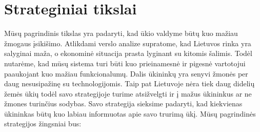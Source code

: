 \documentclass[oneside]{VUMIFPSkursinis}
\begin{document}
\section{Strateginiai tikslai}
	Mūsų pagrindinis tikslas yra padaryti, kad ūkio valdyme būtų kuo mažiau žmogaus įsikišimo. Atlikdami verslo analize supratome, kad Lietuvos rinka yra salyginai maža, o ekonominė situacija prasta lyginant su kitomis šalimis. Todėl nutarėme, kad mūsų sistema turi būti kuo prieinamesnė ir pigesnė vartotojui paaukojant kuo mažiau funkcionalumų. Dalis ūkininkų yra senyvi žmonės per daug nesusipažinę su technologijomis. Taip pat Lietuvoje nėra tiek daug didelių žemės ūkių todėl savo strategijoje turime atsižvelgti ir į mažus ūkininkus ar ne žmones turinčius sodybas. Savo strategija sieksime padaryti, kad kiekvienas ūkininkas būtų kuo labiau informuotas apie savo trurimą ūkį. Mūsų pagrindinės strategijos žingsniai bus:
\end{document}

